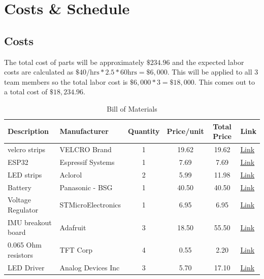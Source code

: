 \newpage
\section{Costs \& Schedule}
\subsection{Costs}
The total cost of parts will be approximately $\$234.96$ and the expected labor costs are calculated as $\$40/\text{hrs} * 2.5 * 60 \text{hrs} = \$6,000$. This will be applied to all 3 team members so the total labor cost is $\$6,000 * 3 = \$18,000$. This comes out to a total cost of $\$18,234.96$.
\begin{table}[htbp]
    \centering
    \caption{Bill of Materials}
    \begin{tabular}{@{} l l S[table-format=1] S[table-format=2.2] S[table-format=5.2] l @{}}
    \toprule
    \textbf{Description} & \textbf{Manufacturer} & {\textbf{Quantity}} & {\textbf{Price/unit}} & {\textbf{Total Price}} & {\textbf{Link}} \\
    \midrule
    velcro strips       & VELCRO Brand         & 1                  & 19.62               & 19.62               & \href{https://tinyurl.com/96a2mzmp}{Link} \\
    ESP32               & Espressif Systems    & 1                  & 7.69                & 7.69                & \href{https://tinyurl.com/53m9m6st}{Link} \\
    LED strips          & Aclorol              & 2                  & 5.99                & 11.98               & \href{https://tinyurl.com/bdjy37u6}{Link} \\
    Battery             & Panasonic - BSG      & 1                  & 40.50               & 40.50               & \href{https://tinyurl.com/3edpx9py}{Link} \\
    Voltage Regulator   & STMicroElectronics   & 1                  & 6.95                & 6.95                & \href{https://tinyurl.com/mucrrked}{Link} \\
    IMU breakout board  & Adafruit             & 3                  & 18.50               & 55.50               & \href{https://tinyurl.com/nhkujh4z}{Link} \\
    0.065 Ohm resistors & TFT Corp             & 4                  & 0.55                & 2.20                & \href{https://tinyurl.com/5d66cf4v}{Link} \\
    LED Driver          & Analog Devices Inc   & 3                  & 5.70                & 17.10               & \href{https://tinyurl.com/27exmb3d}{Link} \\

\end{tabular}
\end{table}
